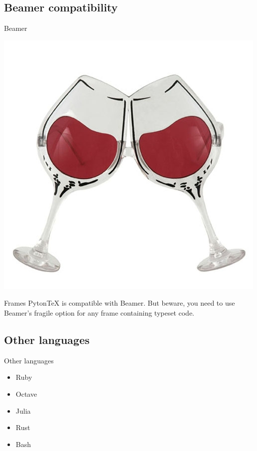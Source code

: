 \documentclass[
aspectratio=1610,
hyperref={pdfpagemode=FullScreen},
english,
usenames,
dvipsnames
]
{beamer} %
\begin{document}
\subsection{Beamer compatibility}
\begin{frame}{Beamer}
\begin{center}
	\includegraphics[scale=0.3, keepaspectratio]{hurra.jpg}
	\begin{alertblock}{Frames}
		Pyton\TeX \hspace{1pt} is compatible with Beamer. But beware, you need to use Beamer's fragile option for any frame containing typeset code.
	\end{alertblock}
\end{center}
\end{frame}

\subsection{Other languages}
\begin{frame}[fragile]{Other languages}
  \begin{itemize}[<+->]
  \item Ruby
  \item Octave
  \item Julia
  \item Rust
  \item Bash
  \end{itemize}
\end{frame}
\end{document}
